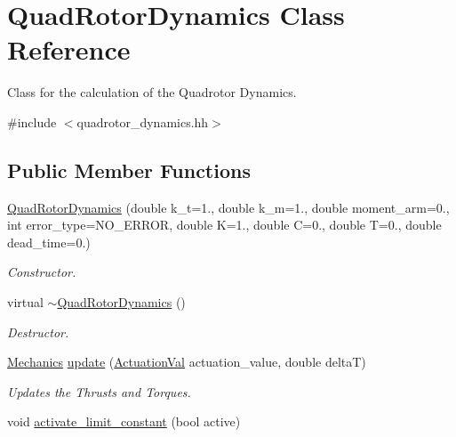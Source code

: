 \hypertarget{classQuadRotorDynamics}{\section{\-Quad\-Rotor\-Dynamics \-Class \-Reference}
\label{classQuadRotorDynamics}
}


\-Class for the calculation of the \-Quadrotor \-Dynamics.  




{\ttfamily \#include $<$quadrotor\-\_\-dynamics.\-hh$>$}

\subsection*{\-Public \-Member \-Functions}
\begin{DoxyCompactItemize}
\item 
\hyperlink{classQuadRotorDynamics_a372eda60cafabb0a7f1d2ee2e32258e6}{\-Quad\-Rotor\-Dynamics} (double k\-\_\-t=1., double k\-\_\-m=1., double moment\-\_\-arm=0., int error\-\_\-type=\-N\-O\-\_\-\-E\-R\-R\-O\-R, double \-K=1., double \-C=0., double \-T=0., double dead\-\_\-time=0.)
\begin{DoxyCompactList}\small\item\em \-Constructor. \end{DoxyCompactList}\item 
\hypertarget{classQuadRotorDynamics_ad7b93bca3a67ed73bd274396ba0ad6e7}{virtual \hyperlink{classQuadRotorDynamics_ad7b93bca3a67ed73bd274396ba0ad6e7}{$\sim$\-Quad\-Rotor\-Dynamics} ()}\label{classQuadRotorDynamics_ad7b93bca3a67ed73bd274396ba0ad6e7}

\begin{DoxyCompactList}\small\item\em \-Destructor. \end{DoxyCompactList}\item 
\hyperlink{classMechanics}{\-Mechanics} \hyperlink{classQuadRotorDynamics_a8516ae14795d90e9f484e552b4f94bc8}{update} (\hyperlink{classActuationVal}{\-Actuation\-Val} actuation\-\_\-value, double delta\-T)
\begin{DoxyCompactList}\small\item\em \-Updates the \-Thrusts and \-Torques. \end{DoxyCompactList}\item 
\hypertarget{classQuadRotorDynamics_aa5e7a8721f17b3e893ffaf4ba2e11fe0}{void \hyperlink{classQuadRotorDynamics_aa5e7a8721f17b3e893ffaf4ba2e11fe0}{activate\-\_\-limit\-\_\-constant} (bool active)}\label{classQuadRotorDynamics_aa5e7a8721f17b3e893ffaf4ba2e11fe0}


\end{DoxyCompactItemize}
